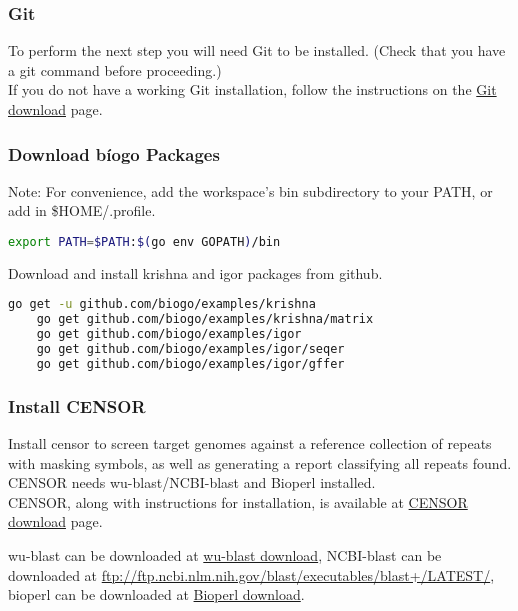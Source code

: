 \documentclass[a4paper,12pt]{article}
\begin{document}
	\subsubsection{Git}
	To perform the next step you will need Git to be installed. (Check that you have a git command before proceeding.) \\
	
	\noindent If you do not have a working Git installation, follow the instructions on the \href{https://git-scm.com/downloads}{\color{blue}Git download} page.
	
	\subsubsection{Download b\'iogo Packages}
	{\color{red} Note:}  For convenience, add the workspace's bin subdirectory to your PATH, or add in \$HOME/.profile. 
	\begin{lstlisting}[language=bash]
	export PATH=$PATH:$(go env GOPATH)/bin \end{lstlisting}
	\noindent Download and install krishna and igor packages from github. 
	
	\begin{lstlisting}[language=bash, columns=flexible]
	go get -u github.com/biogo/examples/krishna
	go get github.com/biogo/examples/krishna/matrix
	go get github.com/biogo/examples/igor
	go get github.com/biogo/examples/igor/seqer
	go get github.com/biogo/examples/igor/gffer \end{lstlisting}
	
	\subsubsection{ Install CENSOR}
	Install censor to screen target genomes against a reference collection of repeats with masking symbols, as well as generating a report classifying all repeats found. CENSOR needs wu-blast/NCBI-blast and Bioperl installed.\\
	
	\noindent CENSOR, along with instructions for installation, is available at \href{http://www.girinst.org/downloads/software/censor/} {\color{blue}CENSOR download} page.
	
	wu-blast can be downloaded at \href{https://www.advbiocomp.com/blast/obsolete/}{\color{blue}wu-blast download}, NCBI-blast can be downloaded at \url{ftp://ftp.ncbi.nlm.nih.gov/blast/executables/blast+/LATEST/}, bioperl can be downloaded at \href{http://bioperl.org/INSTALL.html}{\color{blue}Bioperl download}.
\end{document}

